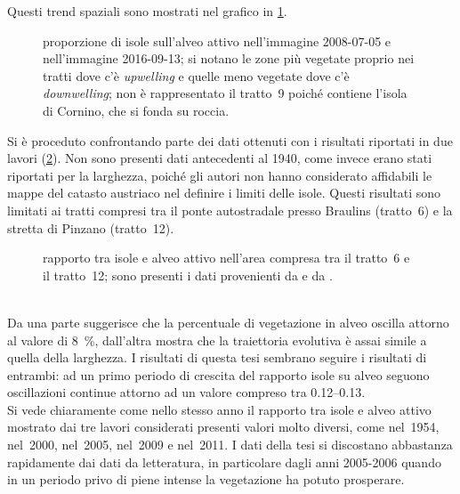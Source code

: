 Questi trend spaziali sono mostrati nel grafico in \cref{graph:rapp-isl-2008-2016}.
%
\begin{figure}
	\centering
	
	\caption[proporzione di isole sull'alveo attivo nel 2008-07-05 e nel 2016-09-13]{proporzione di isole sull'alveo attivo nell'immagine \AST{} 2008-07-05 e nell'immagine \Se{} 2016-09-13; si notano le zone più vegetate proprio nei tratti dove c'è \emph{upwelling} e quelle meno vegetate dove c'è \emph{downwelling}; non è rappresentato il tratto~9 poiché contiene l'isola di Cornino, che si fonda su roccia.}
	\label{graph:rapp-isl-2008-2016}
\end{figure}
%

Si è proceduto confrontando parte dei dati ottenuti con i risultati riportati in due lavori  (\cref{graph:rapp-isl-vs-letteratura}).
Non sono presenti dati antecedenti al 1940, come invece erano stati riportati per la larghezza, poiché gli autori non hanno considerato affidabili le mappe del catasto austriaco nel definire i limiti delle isole.
Questi risultati sono limitati ai tratti compresi tra il ponte autostradale presso Braulins (tratto~6) e la stretta di Pinzano (tratto~12).
%
\begin{figure}
	\centering
	
	\caption[rapporto tra isole e alveo attivo nell'area compresa tra il tratto~6 e il tratto~12]{rapporto tra isole e alveo attivo nell'area compresa tra il tratto~6 e il tratto~12; sono presenti i dati provenienti da  e da .}
	\label{graph:rapp-isl-vs-letteratura}
\end{figure}
%
\\
Da una parte  suggerisce che la percentuale di vegetazione in alveo oscilla attorno al valore di \SI{8}{\percent}, dall'altra  mostra che la traiettoria evolutiva è assai simile a quella della larghezza.
I risultati di questa tesi sembrano seguire i risultati di entrambi: ad un primo periodo di crescita del rapporto isole su alveo seguono oscillazioni continue attorno ad un valore compreso tra \numrange[range-phrase={ e }]{0.12}{0.13}.
\\
Si vede chiaramente come nello stesso anno il rapporto tra isole e alveo attivo mostrato dai tre lavori considerati presenti valori molto diversi, come nel~1954, nel~2000, nel~2005, nel~2009 e nel~2011.
I dati della tesi si discostano abbastanza rapidamente dai dati da letteratura, in particolare dagli anni 2005-2006 quando in un periodo privo di piene intense la vegetazione ha potuto prosperare.
